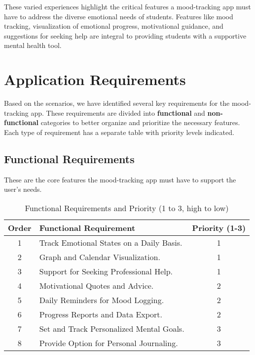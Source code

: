 \noindent These varied experiences highlight the critical features a mood-tracking app must have to address the diverse emotional needs of students. Features like mood tracking, visualization of emotional progress, motivational guidance, and suggestions for seeking help are integral to providing students with a supportive mental health tool.

\section{Application Requirements}

Based on the scenarios, we have identified several key requirements for the mood-tracking app. These requirements are divided into \textbf{functional} and \textbf{non-functional} categories to better organize and prioritize the necessary features. Each type of requirement has a separate table with priority levels indicated.

\subsection{Functional Requirements}

These are the core features the mood-tracking app must have to support the user's needs. \vspace{5mm}

\FloatBarrier
\begin{table}[ht]
\centering
\begin{tabular}{|c|p{7cm}|c|} \hline
\textbf{Order} & \textbf{Functional Requirement} & \textbf{Priority (1-3)} \\ \hline
1 & Track Emotional States on a Daily Basis. & 1 \\ \hline
2 & Graph and Calendar Visualization. & 1 \\ \hline
3 & Support for Seeking Professional Help. & 1 \\ \hline
4 & Motivational Quotes and Advice. & 2 \\ \hline
5 & Daily Reminders for Mood Logging. & 2 \\ \hline
6 & Progress Reports and Data Export. & 2 \\ \hline
7 & Set and Track Personalized Mental Goals. & 3 \\ \hline
8 & Provide Option for Personal Journaling. & 3 \\ \hline
\end{tabular}
\caption{Functional Requirements and Priority (1 to 3, high to low)}
\label{tab:functional_requirements}
\end{table}
\FloatBarrier

